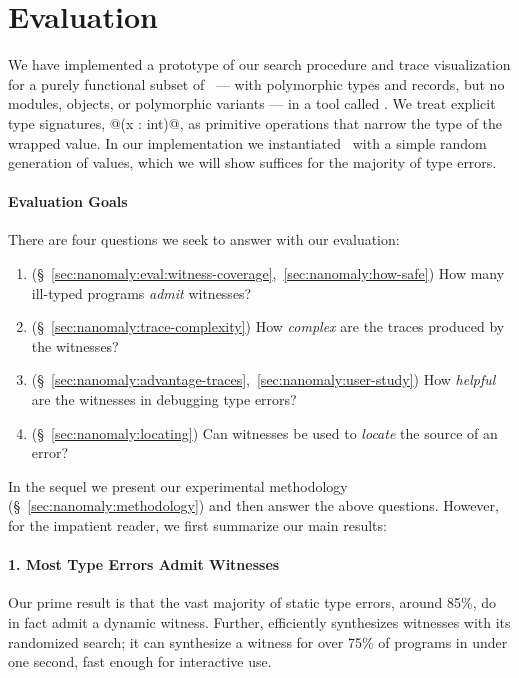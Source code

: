 \section{Evaluation}
\label{sec:nanomaly:evaluation}

We have implemented a prototype of our search procedure and trace
visualization for a purely functional subset of \ocaml\ --- with
polymorphic types and records, but no modules, objects, or polymorphic
variants --- in a tool called \nanomaly.
%
We treat explicit type signatures, \eg @(x : int)@, as
primitive operations that narrow the type of the wrapped value.
%
In our implementation we instantiated \gensym\ with a simple random
generation of values, which we will show suffices for the majority of
type errors.

\paragraph{Evaluation Goals}
%
There are four questions we seek to answer with our evaluation:
%
\begin{enumerate}
\item {} (\S~\ref{sec:nanomaly:eval:witness-coverage},~\ref{sec:nanomaly:how-safe})
      How many ill-typed programs \emph{admit} witnesses?
\item {} (\S~\ref{sec:nanomaly:trace-complexity})
      How \emph{complex} are the traces produced by the witnesses?
\item {} (\S~\ref{sec:nanomaly:advantage-traces},~\ref{sec:nanomaly:user-study})
      How \emph{helpful} %
      are the witnesses in debugging type errors?
\item {} (\S~\ref{sec:nanomaly:locating})
      Can witnesses be used to \emph{locate} the source
      of an error?
\end{enumerate}

In the sequel we present our experimental methodology (\S~\ref{sec:nanomaly:methodology})
and then answer the above questions.
%
However, for the impatient reader, we first summarize our main results:

\paragraph{1. Most Type Errors Admit Witnesses}
Our prime result is that the vast majority of static type errors, around
85\%, do in fact admit a dynamic witness.
%
Further, \toolname efficiently synthesizes witnesses with its randomized search;
it can synthesize a witness for over 75\% of programs in under one second, \ie
fast enough for interactive use. %
%

